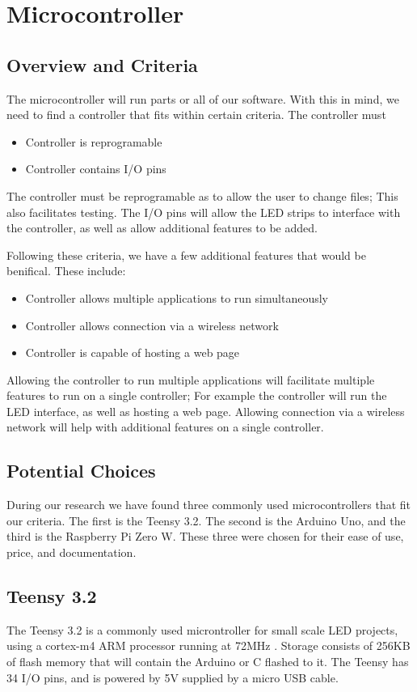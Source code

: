 \section{Microcontroller}
	\subsection{Overview and Criteria}
	The microcontroller will run parts or all of our software. With this in mind,
	we need to find a controller that fits within certain criteria. The
	controller must
	\begin{itemize}
		\item Controller is reprogramable
		\item Controller contains I/O pins
	\end{itemize}
	The controller must be reprogramable as to allow the user to change files;
	This also facilitates testing. The I/O pins will allow the LED strips to
	interface with the controller, as well as allow additional features to be
	added.

	\vspace{5mm}
	\noindent Following these criteria, we have a few additional features that would be
	benifical. These include:
	\begin{itemize}
		\item Controller allows multiple applications to run simultaneously
		\item Controller allows connection via a wireless network
		\item Controller is capable of hosting a web page
	\end{itemize}
	Allowing the controller to run multiple applications will facilitate
	multiple features to run on a single controller; For example the controller
	will run the LED interface, as well as hosting a web page. Allowing
	connection via a wireless network will help with additional features on a
	single controller.
	\subsection{Potential Choices}
	During our research we have found three commonly used microcontrollers that
	fit our criteria. The first is the Teensy 3.2. The second is the Arduino Uno,
	and the third is the Raspberry Pi Zero W. These three were chosen for their
	ease of use, price, and documentation.
	\subsection{Teensy 3.2}
	The Teensy 3.2 is a commonly used microntroller for small scale LED projects,
	using a cortex-m4 ARM processor running at 72MHz \cite[Pg 7]{K20}. Storage consists
	of 256KB of flash memory that will contain the Arduino or C flashed to it.
	The Teensy has 34 I/O pins, and is powered by 5V supplied by a micro USB
	cable.

